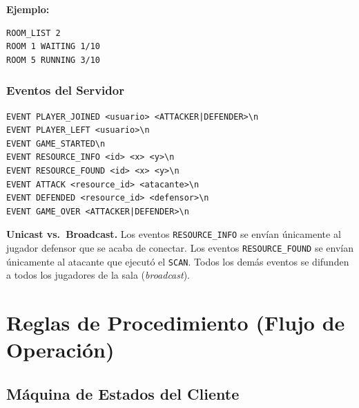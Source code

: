 \documentclass[12pt, letterpaper]{article}
\begin{document}
\textbf{Ejemplo:}
\begin{lstlisting}
ROOM_LIST 2
ROOM 1 WAITING 1/10
ROOM 5 RUNNING 3/10
\end{lstlisting}

\subsubsection{Eventos del Servidor}

\begin{lstlisting}
EVENT PLAYER_JOINED <usuario> <ATTACKER|DEFENDER>\n
EVENT PLAYER_LEFT <usuario>\n
EVENT GAME_STARTED\n
EVENT RESOURCE_INFO <id> <x> <y>\n
EVENT RESOURCE_FOUND <id> <x> <y>\n
EVENT ATTACK <resource_id> <atacante>\n
EVENT DEFENDED <resource_id> <defensor>\n
EVENT GAME_OVER <ATTACKER|DEFENDER>\n
\end{lstlisting}

\begin{nota}
\textbf{Unicast vs.\ Broadcast.} Los eventos \texttt{RESOURCE\_INFO} se envían
únicamente al jugador defensor que se acaba de conectar. Los eventos \texttt{RESOURCE\_FOUND}
se envían únicamente al atacante que ejecutó el \texttt{SCAN}. Todos los demás
eventos se difunden a todos los jugadores de la sala (\textit{broadcast}).
\end{nota}

\section{Reglas de Procedimiento (Flujo de Operación)}

\subsection{Máquina de Estados del Cliente}
\end{document}

